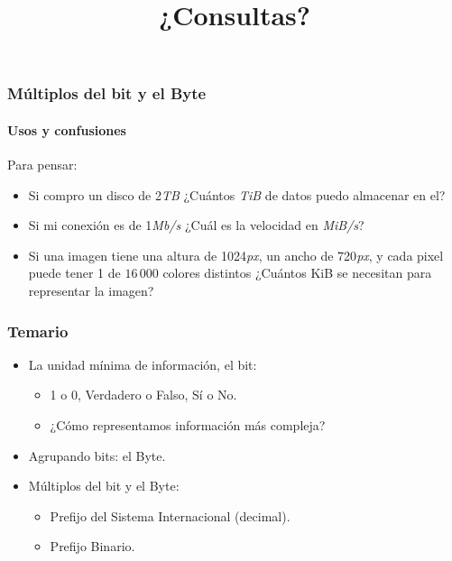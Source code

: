 \documentclass[11pt,a4paper,spanish]{beamer}
\begin{document}
\begin{frame}

\frametitle{Múltiplos del bit y el Byte}

\framesubtitle{Usos y confusiones}

Para pensar:

\begin{itemize}
    \item Si compro un disco de 2\emph{TB} ¿Cuántos \emph{TiB} de datos puedo
        almacenar en el?
    \item Si mi conexión es de 1\emph{Mb/s} ¿Cuál es la velocidad en
        \emph{MiB/s}?
    \item Si una imagen tiene una altura de 1024\emph{px}, un ancho de
        720\emph{px}, y cada pixel puede tener 1 de $16\,000$ colores
        distintos ¿Cuántos KiB se necesitan para representar la imagen?
\end{itemize}

\end{frame}

\begin{frame}

    \frametitle{Temario}

\begin{itemize}

    \item La unidad mínima de información, el bit:
    \begin{itemize}
        \item 1 o 0, Verdadero o Falso, Sí o No.
        \item ¿Cómo representamos información más compleja?
    \end{itemize}

    \item Agrupando bits: el Byte.

    \item Múltiplos del bit y el Byte:
    \begin{itemize}
        \item Prefijo del Sistema Internacional (decimal).
        \item Prefijo Binario.
    \end{itemize}

\end{itemize}
\end{frame}

\begin{frame}

\title{¿Consultas?}
\maketitle

\end{frame}

\setcounter{lastPage}{\number\value{page}}

\setcounter{page}{\number\value{lastPage}}
\end{document}
